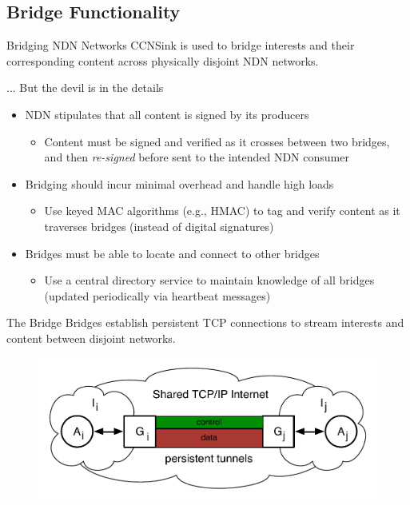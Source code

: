 \documentclass[handout]{beamer}
\begin{document}
\subsection{Bridge Functionality}
\begin{frame}{Bridging NDN Networks}
	{\sf CCNSink} is used to bridge interests and their corresponding content across physically disjoint NDN networks.

	\medskip

	... But the devil is in the details
	\begin{itemize}
		\item NDN stipulates that all content is signed by its producers
		\begin{itemize}
			\item Content must be signed and verified as it crosses between two bridges, and then \emph{re-signed} before sent to the intended NDN consumer
		\end{itemize}
		\item Bridging should incur minimal overhead and handle high loads
		\begin{itemize}
			\item Use keyed MAC algorithms (e.g., HMAC) to tag and verify content as it traverses bridges (instead of digital signatures)
		\end{itemize}
		\item Bridges must be able to locate and connect to other bridges
		\begin{itemize}
			\item Use a central directory service to maintain knowledge of all bridges (updated periodically via heartbeat messages)
		\end{itemize}
	\end{itemize}
\end{frame}

\begin{frame}{The Bridge}
	Bridges establish persistent TCP connections to stream interests and content between disjoint networks. 
	\begin{figure}[h]
		\includegraphics[scale=0.5]{img/island_tunnel.pdf}
	\end{figure}
\end{frame}
\end{document}
